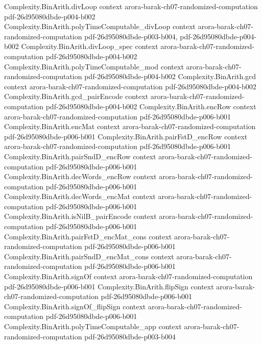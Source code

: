 \begin{theorem}
  {Complexity.BinArith.divLoop}
  {context}
  {arora-barak-ch07-randomized-computation}
  {pdf-26d95080dbde-p004-b002}
\proofstep
  {Complexity.BinArith.polyTimeComputable_divLoop}
  {context}
  {arora-barak-ch07-randomized-computation}
  {pdf-26d95080dbde-p003-b004,
    pdf-26d95080dbde-p004-b002}
\proofstep
  {Complexity.BinArith.divLoop_spec}
  {context}
  {arora-barak-ch07-randomized-computation}
  {pdf-26d95080dbde-p004-b002}
\proofstep
  {Complexity.BinArith.polyTimeComputable_mod}
  {context}
  {arora-barak-ch07-randomized-computation}
  {pdf-26d95080dbde-p004-b002}
\proofstep
  {Complexity.BinArith.gcd}
  {context}
  {arora-barak-ch07-randomized-computation}
  {pdf-26d95080dbde-p004-b002}
\proofstep
  {Complexity.BinArith.gcd_pairEncode}
  {context}
  {arora-barak-ch07-randomized-computation}
  {pdf-26d95080dbde-p004-b002}
\proofstep
  {Complexity.BinArith.encRow}
  {context}
  {arora-barak-ch07-randomized-computation}
  {pdf-26d95080dbde-p006-b001}
\proofstep
  {Complexity.BinArith.encMat}
  {context}
  {arora-barak-ch07-randomized-computation}
  {pdf-26d95080dbde-p006-b001}
\proofstep
  {Complexity.BinArith.pairFstD_encRow}
  {context}
  {arora-barak-ch07-randomized-computation}
  {pdf-26d95080dbde-p006-b001}
\proofstep
  {Complexity.BinArith.pairSndD_encRow}
  {context}
  {arora-barak-ch07-randomized-computation}
  {pdf-26d95080dbde-p006-b001}
\proofstep
  {Complexity.BinArith.decWords_encRow}
  {context}
  {arora-barak-ch07-randomized-computation}
  {pdf-26d95080dbde-p006-b001}
\proofstep
  {Complexity.BinArith.decWords_encMat}
  {context}
  {arora-barak-ch07-randomized-computation}
  {pdf-26d95080dbde-p006-b001}
\proofstep
  {Complexity.BinArith.isNilB_pairEncode}
  {context}
  {arora-barak-ch07-randomized-computation}
  {pdf-26d95080dbde-p006-b001}
\proofstep
  {Complexity.BinArith.pairFstD_encMat_cons}
  {context}
  {arora-barak-ch07-randomized-computation}
  {pdf-26d95080dbde-p006-b001}
\proofstep
  {Complexity.BinArith.pairSndD_encMat_cons}
  {context}
  {arora-barak-ch07-randomized-computation}
  {pdf-26d95080dbde-p006-b001}
\proofstep
  {Complexity.BinArith.signOf}
  {context}
  {arora-barak-ch07-randomized-computation}
  {pdf-26d95080dbde-p006-b001}
\proofstep
  {Complexity.BinArith.flipSign}
  {context}
  {arora-barak-ch07-randomized-computation}
  {pdf-26d95080dbde-p006-b001}
\proofstep
  {Complexity.BinArith.signOf_flipSign}
  {context}
  {arora-barak-ch07-randomized-computation}
  {pdf-26d95080dbde-p006-b001}
\proofstep
  {Complexity.BinArith.polyTimeComputable_app}
  {context}
  {arora-barak-ch07-randomized-computation}
  {pdf-26d95080dbde-p003-b004}

\end{theorem}
